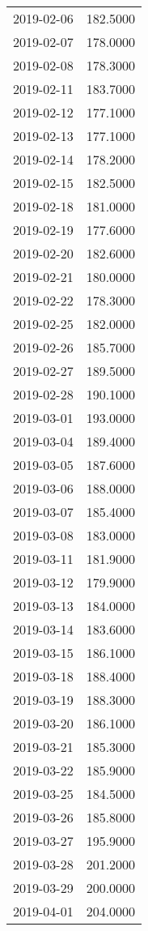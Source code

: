 \begin{tabular}{lr}
2019-02-06 &    182.5000 \\
2019-02-07 &    178.0000 \\
2019-02-08 &    178.3000 \\
2019-02-11 &    183.7000 \\
2019-02-12 &    177.1000 \\
2019-02-13 &    177.1000 \\
2019-02-14 &    178.2000 \\
2019-02-15 &    182.5000 \\
2019-02-18 &    181.0000 \\
2019-02-19 &    177.6000 \\
2019-02-20 &    182.6000 \\
2019-02-21 &    180.0000 \\
2019-02-22 &    178.3000 \\
2019-02-25 &    182.0000 \\
2019-02-26 &    185.7000 \\
2019-02-27 &    189.5000 \\
2019-02-28 &    190.1000 \\
2019-03-01 &    193.0000 \\
2019-03-04 &    189.4000 \\
2019-03-05 &    187.6000 \\
2019-03-06 &    188.0000 \\
2019-03-07 &    185.4000 \\
2019-03-08 &    183.0000 \\
2019-03-11 &    181.9000 \\
2019-03-12 &    179.9000 \\
2019-03-13 &    184.0000 \\
2019-03-14 &    183.6000 \\
2019-03-15 &    186.1000 \\
2019-03-18 &    188.4000 \\
2019-03-19 &    188.3000 \\
2019-03-20 &    186.1000 \\
2019-03-21 &    185.3000 \\
2019-03-22 &    185.9000 \\
2019-03-25 &    184.5000 \\
2019-03-26 &    185.8000 \\
2019-03-27 &    195.9000 \\
2019-03-28 &    201.2000 \\
2019-03-29 &    200.0000 \\
2019-04-01 &    204.0000 \\

\end{tabular}
